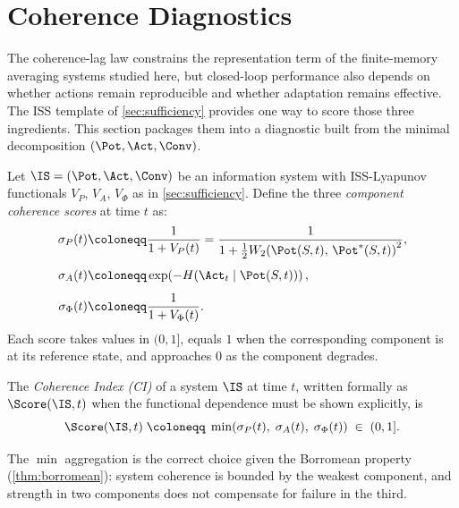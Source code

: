 \section{Coherence Diagnostics}\label{sec:tci}

The coherence-lag law constrains the representation term of the finite-memory
averaging systems studied here, but closed-loop performance also depends on
whether actions remain reproducible and whether adaptation remains effective.
The ISS template of \cref{sec:sufficiency} provides one way to score those
three ingredients. This section packages them into a diagnostic built from the
minimal decomposition $(\Pot,\Act,\Conv)$.

\begin{definition}\label{def:component_scores}
Let $\IS = (\Pot,\Act,\Conv)$ be an information system with ISS-Lyapunov
functionals $V_P$, $V_A$, $V_\Phi$ as in \cref{sec:sufficiency}.
Define the three \emph{component coherence scores} at time $t$ as:
\begin{align}
  \sigma_P(t)
    &\coloneqq \frac{1}{1 + V_P(t)}
     = \frac{1}{1 + \tfrac{1}{2}W_2\!\left(\Pot(S,t),\,\Pot^*(S,t)\right)^2},
    \label{eq:sigmaP}\\[4pt]
  \sigma_A(t)
    &\coloneqq \exp\!\left(-H\!\left(\Act_t\mid\Pot(S,t)\right)\right),
    \label{eq:sigmaA}\\[4pt]
  \sigma_\Phi(t)
    &\coloneqq \frac{1}{1 + V_\Phi(t)}.
    \label{eq:sigmaPhi}
\end{align}
Each score takes values in $(0,1]$, equals $1$ when the corresponding
component is at its reference state, and approaches $0$ as the component degrades.
\end{definition}

\begin{definition}\label{def:tci}
The \emph{Coherence Index (CI)} of a system $\IS$ at time $t$, written formally
as $\Score(\IS,t)$ when the functional dependence must be shown explicitly, is
\[
  \Score(\IS, t)
  \;\coloneqq\;
  \min\!\left(\sigma_P(t),\;\sigma_A(t),\;\sigma_\Phi(t)\right)
  \;\in\;(0,1].
\]
\end{definition}

The $\min$ aggregation is the correct choice given the Borromean property
(\cref{thm:borromean}): system coherence is bounded by the weakest component,
and strength in two components does not compensate for failure in the third.

